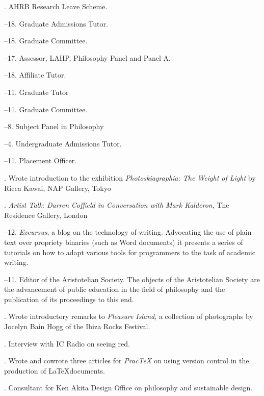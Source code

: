 \documentclass[11pt]{article}
\begin{document}
\medskip
  
. AHRB Research Leave Scheme.

\bigskip 

\medskip

--18. Graduate Admissions Tutor.

--18. Graduate Committee.

--17. Assessor, LAHP, Philosophy Panel and Panel A.

--18. Affiliate Tutor.

--11. Graduate Tutor

--11. Graduate Committee.

--8. Subject Panel in Philosophy

--4. Undergraduate Admissions Tutor.

--11. Placement Officer.

\bigskip

\medskip

. Wrote introduction to the exhibition \emph{Photoskiagraphia: The Weight of Light} by Ricca Kawai, NAP Gallery, Tokyo

. \emph{Artist Talk: Darren Coffield in Conversation with Mark Kalderon}, The Residence Gallery, London

--12. \emph{Excursus}, a blog on the technology of writing. Advocating the use of plain text over propriety binaries (such as Word documents) it presents a series of tutorials on how to adapt various tools for programmers to the task of academic writing.

--11. Editor of the Aristotelian Society. The objects of the Aristotelian Society are the advancement of public education in the field of philosophy and the publication of its proceedings to this end. 

. Wrote introductory remarks to \emph{Pleasure Island}, a collection of photographs by Jocelyn Bain Hogg of the Ibiza Rocks Festival.

. Interview with IC Radio on seeing red.

. Wrote and cowrote three articles for \emph{PracTeX} on using version control in the production of \LaTeX documents.

. Consultant for Ken Akita Design Office on philosophy and sustainable design.
\end{document}

